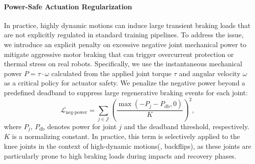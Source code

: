 \paragraph{Power-Safe Actuation Regularization}
In practice, highly dynamic motions can induce large transient braking loads that are not explicitly regulated in standard training pipelines. To address the issue, we introduce an explicit penalty on excessive negative joint mechanical power to mitigate aggressive motor braking that can trigger overcurrent protection or thermal stress on real robots. Specifically, we use the instantaneous mechanical power $P = \tau\cdot\omega$ calculated from the applied joint torque $\tau$ and angular velocity $\omega$ as a critical policy for actuator safety. We penalize the negative power beyond a predefined deadband to suppress large regenerative braking events for each joint:
\begin{equation}
\mathcal{L}_{\text{neg-power}}
=
\sum_{j \in \mathcal{J}}
\left(
\frac{
\max(-P_j - P_{\text{db}}, 0)
}{K}
\right)^{2},
\end{equation}
where $P_j$, $P_{\text{db}}$ denotes power for joint $j$ and the deadband threshold, respectively. $K$ is a normalizing constant. In practice, this term is selectively applied to the knee joints in the context of high-dynamic motions(\eg, backflips), as these joints are particularly prone to high braking loads during impacts and recovery phases.




